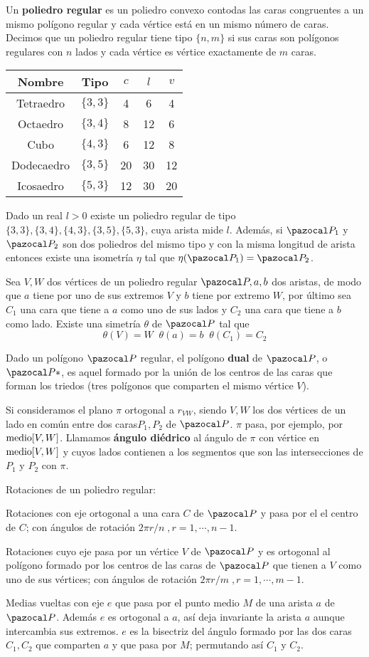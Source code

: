  Un \textbf{poliedro regular} es un poliedro convexo contodas las caras congruentes a un mismo polígono regular y cada vértice está en un mismo número de caras. Decimos que un poliedro regular tiene tipo $\{n, m\}$ si sus caras son polígonos regulares con $n$ lados y cada vértice es vértice exactamente de $m$ caras.

\begin{tabular}{ccccc}
	Nombre & Tipo & $c$ & $l$ & $v$ \\\midrule
	Tetraedro & $\{3,3\} $& 4 & 6 & 4 \\
	Octaedro & $\{3,4\}$ & 8 & 12 & 6 \\
	Cubo & $\{4,3\}$ & 6 & 12 & 8 \\
	Dodecaedro & $\{3,5\}$ & 20 & 30 & 12 \\
	Icosaedro & $\{5,3\}$ & 12 & 30 & 20 \\
\end{tabular}

 Dado un real $l>0$ existe un poliedro regular de tipo $\{3,3\},\{3,4\},\{4,3\},\{3,5\},\{5,3\}$, cuya arista mide $l$. Además, si $\PP_1$ y $\PP_2$ son dos poliedros del mismo tipo y con la misma longitud de arista entonces existe una isometría $\eta$ tal que $\eta(\PP_1) = \PP_2$.

 Sea $V, W$ dos vértices de un poliedro regular $\PP, a, b$ dos aristas, de modo que $a$ tiene por uno de sus extremos $V$ y $b$ tiene por extremo $W$, por último sea $C_1$ una cara que tiene a $a$ como uno de sus lados y $C_2$ una cara que tiene a $b$ como lado. Existe una simetría $\theta$ de $\PP$ tal que
\[\theta(V) = W \;\; \theta(a)=b \;\; \theta(C_1) = C_2  \]

 Dado un polígono $\PP$ regular, el polígono \textbf{dual} de $\PP$, o $\PP*$, es aquel formado por la unión de los centros de las caras que forman los triedos (tres polígonos que comparten el mismo vértice $V$).

 Si consideramos el plano $\pi$ ortogonal a $r_{VW}$, siendo $V,W$ los dos vértices de un lado en común entre dos caras$P_1, P_2$ de $\PP$. $\pi$ pasa, por ejemplo, por $\text{medio}[V,W]$. Llamamos \textbf{ángulo diédrico} al ángulo de $\pi$ con vértice en $\text{medio}[V,W]$ y cuyos lados contienen a los segmentos que son las intersecciones de $P_1$ y $P_2$ con $\pi$.

Rotaciones de un poliedro regular:
\begin{itemizex}
	\item Rotaciones con eje ortogonal a una cara $C$ de $\PP$ y pasa por el el centro de $C$; con ángulos de rotación $2\pi r/n\;,r = 1, \cdots, n-1$.
	\item Rotaciones cuyo eje pasa por un vértice $V$ de $\PP$ y es ortogonal al polígono formado por los centros de las caras de $\PP$ que tienen a $V$ como uno de sus vértices; con ángulos de rotación $2\pi r/m\;,r = 1, \cdots, m-1$.
	\item Medias vueltas con eje $e$ que pasa por el punto medio $M$ de una arista $a$ de $\PP$. Además $e$ es ortogonal a $a$, así deja invariante la arista $a$ aunque intercambia sus extremos. $e$ es la bisectriz del ángulo formado por las dos caras $C_1, C_2$ que comparten $a$ y que pasa por $M$; permutando así $C_1$ y $C_2$.
\end{itemizex}
